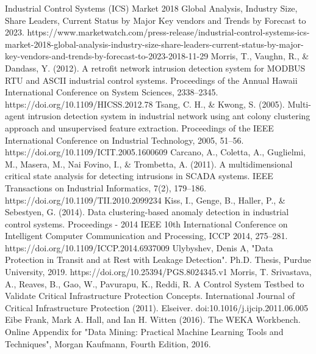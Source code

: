 \documentclass[conference]{IEEEtran}
\begin{document}
\begin{thebibliography}{00}
Industrial Control Systems (ICS) Market 2018 Global Analysis, Industry Size, Share Leaders, Current Status by Major Key vendors and Trends by Forecast to 2023. https://www.marketwatch.com/press-release/industrial-control-systems-ics-market-2018-global-analysis-industry-size-share-leaders-current-status-by-major-key-vendors-and-trends-by-forecast-to-2023-2018-11-29
Morris, T., Vaughn, R., \& Dandass, Y. (2012). A retrofit network intrusion detection system for MODBUS RTU and ASCII industrial control systems. Proceedings of the Annual Hawaii International Conference on System Sciences, 2338–2345. https://doi.org/10.1109/HICSS.2012.78
Tsang, C. H., \& Kwong, S. (2005). Multi-agent intrusion detection system in industrial network using ant colony clustering approach and unsupervised feature extraction. Proceedings of the IEEE International Conference on Industrial Technology, 2005, 51–56. https://doi.org/10.1109/ICIT.2005.1600609
Carcano, A., Coletta, A., Guglielmi, M., Masera, M., Nai Fovino, I., \& Trombetta, A. (2011). A multidimensional critical state analysis for detecting intrusions in SCADA systems. IEEE Transactions on Industrial Informatics, 7(2), 179–186. https://doi.org/10.1109/TII.2010.2099234
Kiss, I., Genge, B., Haller, P., & Sebestyen, G. (2014). Data clustering-based anomaly detection in industrial control systems. Proceedings - 2014 IEEE 10th International Conference on Intelligent Computer Communication and Processing, ICCP 2014, 275–281. https://doi.org/10.1109/ICCP.2014.6937009
 Ulybyshev, Denis A, "Data Protection in Transit and at Rest with Leakage Detection". Ph.D. Thesis, Purdue University, 2019. https://doi.org/10.25394/PGS.8024345.v1
Morris, T. Srivastava, A., Reaves, B., Gao, W., Pavurapu, K., Reddi, R. A Control System Testbed to Validate Critical Infrastructure Protection Concepts. International Journal of Critical Infrastructure Protection (2011). Elseiver. doi:10.1016/j.ijcip.2011.06.005
Eibe Frank, Mark A. Hall, and Ian H. Witten (2016). The WEKA Workbench. Online Appendix for "Data Mining: Practical Machine Learning Tools and Techniques", Morgan Kaufmann, Fourth Edition, 2016.
\end{thebibliography}
\vspace{12pt}
\end{document}

